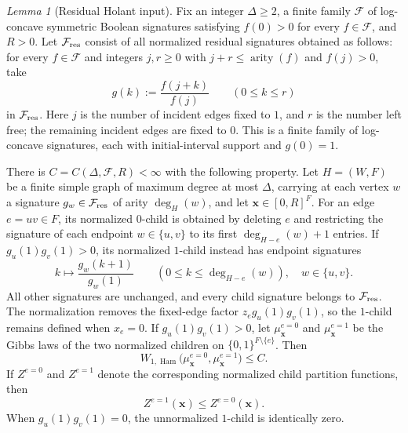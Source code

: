 \documentclass[11pt,reqno]{article}
\theoremstyle{plain}
\newtheorem{lemma}[theorem]{Lemma}
\theoremstyle{definition}
\theoremstyle{remark}
\newtheorem{lemma}[lemma]{Lemma}
\theoremstyle{definition}
\theoremstyle{remark}
\DeclareMathOperator{\Ham}{Ham}
\newcommand{\Deg}{\Delta}                        %
\newcommand{\WHam}{W_{1,\Ham}}                   %
\begin{document}
\begin{lemma}[Residual Holant input]
\label{lem:holant-residual-input}
Fix an integer \(\Deg\ge2\), a finite family \(\mathcal F\) of log-concave
symmetric Boolean signatures satisfying \(f(0)>0\) for every
\(f\in\mathcal F\), and \(R>0\).  Let \(\mathcal F_{\rm res}\) consist
of all normalized residual signatures obtained as follows: for every
\(f\in\mathcal F\) and integers \(j,r\ge0\) with
\(j+r\le\operatorname{arity}(f)\) and \(f(j)>0\), take
\[
  g(k):=\frac{f(j+k)}{f(j)}
  \qquad(0\le k\le r)
\]
in \(\mathcal F_{\rm res}\).  Here \(j\) is the number of incident edges
fixed to \(1\), and \(r\) is the number left free; the remaining incident
edges are fixed to \(0\).  This is a finite family of log-concave
signatures, each with initial-interval support and \(g(0)=1\).

There is \(C=C(\Deg,\mathcal F,R)<\infty\) with the following property.
Let \(H=(W,F)\) be a finite simple graph of maximum degree at most
\(\Deg\), carrying at each vertex \(w\) a signature
\(g_w\in\mathcal F_{\rm res}\) of arity \(\deg_H(w)\), and let
\(\mathbf x\in[0,R]^F\).  For an edge \(e=uv\in F\), its normalized
\(0\)-child is obtained by deleting \(e\) and restricting the signature
of each endpoint \(w\in\{u,v\}\) to its first \(\deg_{H-e}(w)+1\) entries.  If
\(g_u(1)g_v(1)>0\), its normalized \(1\)-child instead has endpoint
signatures
\[
  k\longmapsto\frac{g_w(k+1)}{g_w(1)}
  \qquad(0\le k\le\deg_{H-e}(w)),\quad w\in\{u,v\}.
\]
All other signatures are unchanged, and every child signature belongs
to \(\mathcal F_{\rm res}\).  The normalization removes the fixed-edge
factor \(z_e g_u(1)g_v(1)\), so the \(1\)-child remains defined when
\(x_e=0\).  If \(g_u(1)g_v(1)>0\), let
\(\mu_{\mathbf x}^{e=0}\) and \(\mu_{\mathbf x}^{e=1}\) be the Gibbs laws
of the two normalized children on \(\{0,1\}^{F\setminus\{e\}}\).  Then
\[
  \WHam\bigl(\mu_{\mathbf x}^{e=0},
             \mu_{\mathbf x}^{e=1}\bigr)\le C.
\]
If \(Z^{e=0}\) and \(Z^{e=1}\) denote the corresponding normalized child
partition functions, then
\begin{equation}\label{eq:holant-child-monotonicity}
  Z^{e=1}(\mathbf x)\le Z^{e=0}(\mathbf x).
\end{equation}
When \(g_u(1)g_v(1)=0\), the unnormalized \(1\)-child is identically zero.
\end{lemma}
\end{document}
